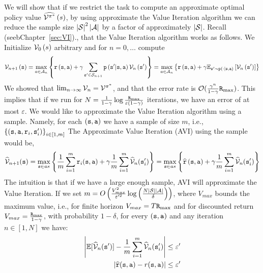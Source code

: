 We will show that if we restrict the task to compute an approximate
optimal policy value $\widehat{\mathcal{V}^{\pi^{*}}}\left(s\right)$, by using
approximate the Value Iteration algorithm we can reduce the sample
size $\left|\mathcal{S}\right|^{2}\left|\mathcal{A}\right|$ by a
factor of approximately $\left|\mathcal{S}\right|$.
Recall (seebChapter~\ref{sec:VI})., that the Value Iteration algorithm works as follows. We Initialize
$\mathcal{V}_{0}\left(s\right)$ arbitrary and for $n=0,\dots$ compute
\[
\mathcal{V}_{n+1}\left({\tt s}\right)=\max_{a\in\mathcal{A}_{n}}\left\{ {\tt r}\left({\tt s},{\tt a}\right)+\gamma\sum_{{\tt s}'\in\mathcal{S}_{n+1}}{\tt p}\left({\tt s}'|{\tt s},{\tt a}\right)\mathcal{V}_{n}\left({\tt s}'\right)\right\} =\max_{a\in\mathcal{A}_{n}}\left\{{\tt r}\left({\tt s},{\tt a}\right)+\gamma\mathbb{E}_{{\tt s}'\sim {\tt p}\left(\cdot|{\tt s},{\tt a}\right)}\left[\mathcal{V}_{n}\left({\tt s}'\right)\right]\right\} 
\]
We showed that $\lim_{n\rightarrow\infty}\mathcal{V}_{n}=\mathcal{V}^{\pi^{*}}$,
and that the error rate is $\mathcal{O}(\frac{\gamma^{n}}{1-\gamma}{\tt R}_{\max })$.
This implies that if we run for $N=\frac{1}{1-\gamma}\log\frac{{\tt R}_{\max }}{\varepsilon(1-\gamma)}$
iterations, we have an error of at most $\varepsilon$.
We would like to approximate the Value Iteration algorithm using a
sample. Namely, for each $({\tt s},{\tt a})$ we have a sample of size $m$, i.e.,$\left\{ ({\tt s},{\tt a},{\tt r}_{i},{\tt s}'_{i})\right\} _{i\in[1,m]}$
The Approximate Value Iteration (AVI) using the sample would be, 
\[
\widehat{\mathcal{V}}_{n+1}({\tt s})=\max_{{\tt s}\in as}\left\{ \frac{1}{m}\sum_{i=1}^{m}{\tt r}_{i}({\tt s},{\tt a})+\gamma\frac{1}{m}\sum_{i=1}^{m}\widehat{\mathcal{V}}_{n}({\tt s}'_{i})\right\} =\max_{{\tt s}\in as}\left\{ \widehat{{\tt r}}\left({\tt s},{\tt a}\right)+\gamma\frac{1}{m}\sum_{i=1}^{m}\widehat{\mathcal{V}}_{n}({\tt s}'_{i})\right\} 
\]
The intuition is that if we have a large enough sample, AVI will approximate
the Value Iteration. If we set $m=O\left(\frac{V_{max}^{2}}{\varepsilon'^{2}}\log\left(\frac{N\left|\mathcal{S}\right|\left|\mathcal{A}\right|}{\delta}\right)\right)$,
where $V_{max}$ bounds the maximum value, i.e., for finite horizon $V_{max}=T{\tt R}_{\max }$
and for discounted return $V_{max}=\frac{{\tt R}_{\max }}{1-\gamma}$, with
probability $1-\delta$, for every $({\tt s},{\tt a})$ and any iteration $n\in[1,N]$
we have: 
\begin{align*}
	\left|\mathbb{E}[\widehat{\mathcal{V}}_{n}({\tt s}')]-\frac{1}{m}\sum_{i=1}^{m}\widehat{\mathcal{V}}_{n}({\tt s}'_{i})\right| & \leq\varepsilon'\\
	\left|\widehat{{\tt r}}({\tt s},{\tt a})-r({\tt s},{\tt a})\right| & \leq\varepsilon'
\end{align*}
